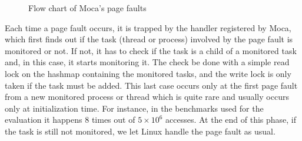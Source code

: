 

\begin{figure}[htb]
    \centering
    
    \caption{Flow chart of Moca's page faults}
    \label{fig:fpf-flow}
\end{figure}

Each time a page fault occurs, it is trapped by the handler registered by
\gls{Moca}, which
first finds out if the task
(thread or process) involved by the page fault is
monitored or not. If not, it has to check if the task is a child of a monitored
task and, in this case, it starts monitoring it. The check be done with a simple
read lock on the hashmap containing the monitored tasks, and the write lock is
only taken if the task must be added.
This last case occurs only at the first page fault from a new monitored
process or thread which is quite rare and usually occurs only at
initialization time. For instance, in the benchmarks used for
the evaluation it happens $8$ times out of $5\times10^6$ accesses.
At the end of this phase, if the task is still not monitored, we let Linux handle the page fault as usual.

